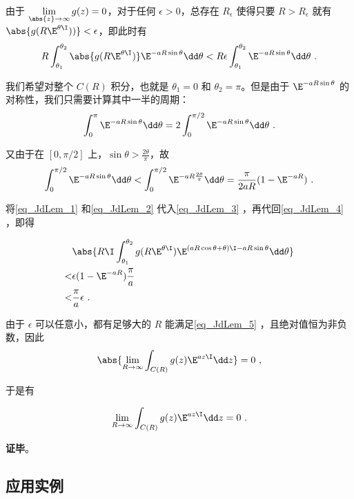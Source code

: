 由于 $\lim\limits_{\abs{z}\to\infty}g(z)=0$，对于任何 $\epsilon>0$，总存在 $R_\epsilon$ 使得只要 $R>R_\epsilon$ 就有 $\abs{g(R\E^{\theta\I}))}<\epsilon$，即此时有
\begin{equation}\label{eq_JdLem_3}
R\int_{\theta_1}^{\theta_2}\abs{g(R\E^{\theta\I})}\E^{-aR\sin\theta}\dd\theta  <  R\epsilon\int_{\theta_1}^{\theta_2}\E^{-aR\sin\theta}\dd\theta~.
\end{equation}

我们希望对整个 $C(R)$ 积分，也就是 $\theta_1=0$ 和 $\theta_2=\pi$。但是由于 $\E^{-aR\sin\theta}$ 的对称性，我们只需要计算其中一半的周期：
\begin{equation}\label{eq_JdLem_1}
\int_{0}^{\pi}\E^{-aR\sin\theta}\dd\theta=2\int^{\pi/2}_{0}\E^{-aR\sin\theta}\dd\theta~.
\end{equation}

又由于在 $[0, \pi/2]$ 上，$\sin\theta>\frac{2\theta}{\pi}$，故
\begin{equation}\label{eq_JdLem_2}
\int^{\pi/2}_{0}\E^{-aR\sin\theta}\dd\theta<\int^{\pi/2}_{0}\E^{-aR\frac{2\theta}{\pi}}\dd\theta=\frac{\pi}{2aR}(1-\E^{-aR})~.
\end{equation}

将\autoref{eq_JdLem_1} 和\autoref{eq_JdLem_2} 代入\autoref{eq_JdLem_3} ，再代回\autoref{eq_JdLem_4} ，即得

\begin{equation}\label{eq_JdLem_5}
\begin{aligned}
&\abs{R\I\int_{\theta_1}^{\theta_2}g(R\E^{\theta\I})\E^{(aR\cos\theta+\theta)\I-aR\sin\theta}\dd\theta}\\
<&\epsilon(1-\E^{-aR})\frac{\pi}{a}\\
<&\frac{\pi}{a}\epsilon~.
\end{aligned}
\end{equation}

由于 $\epsilon$ 可以任意小，都有足够大的 $R$ 能满足\autoref{eq_JdLem_5} ，且绝对值恒为非负数，因此
\begin{equation}
\abs{\lim\limits_{R\to \infty}\int_{C(R)}g(z)\E^{az\I}\dd z}=0~,
\end{equation}

于是有

\begin{equation}
\lim\limits_{R\to \infty}\int_{C(R)}g(z)\E^{az\I}\dd z=0~.
\end{equation}


\textbf{证毕}。


\subsection{应用实例}

